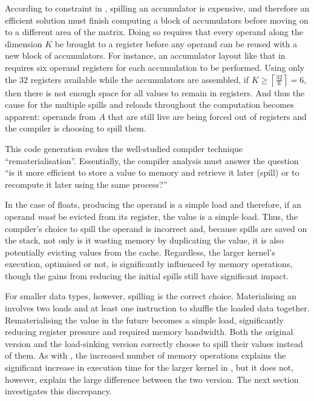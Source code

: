 \documentclass[\main/thesis.tex]{subfiles}
\begin{document}
According to constraint  in , spilling an accumulator is expensive, and therefore an efficient solution must finish computing a block of accumulators before moving on to a different area of the matrix.
Doing so requires that every operand along the dimension $K$ be brought to a register before any operand can be reused with a new block of accumulators.
For instance, an accumulator layout like that in  requires six operand registers for each accumulation to be performed.
Using only the 32 registers available while the accumulators are assembled, if $K \geq \left\lceil \frac{32}{6} \right\rceil = 6$, then there is not enough space for all values to remain in registers.
And thus the cause for the multiple spills and reloads throughout the computation becomes apparent: operands from $A$ that are still \gls{live} are being forced out of registers and the compiler is choosing to spill them.\footnotemark
{}

This code generation evokes the well-studied compiler technique ``\gls{rematerialisation}''.
Essentially, the compiler analysis must answer the question ``is it more efficient to store a value to memory and retrieve it later (\gls{spill}) or to recompute it later using the same process?''

In the case of floats, producing the operand is a simple load and therefore, if an operand \emph{must} be evicted from its register,  the value is a simple load.
Thus, the compiler's choice to spill the operand is incorrect and, because spills are saved on the stack, not only is it wasting memory by duplicating the value, it is also potentially evicting values from the cache.
Regardless, the larger kernel's execution, optimised or not, is significantly influenced by memory operations, though the gains from reducing the initial spills still have significant impact.

For smaller data types, however, spilling is the correct choice.
Materialising an  involves two loads and at least one instruction to shuffle the loaded data together.
Rematerialising the value in the future becomes a simple load, significantly reducing register pressure and required memory bandwidth.
Both the original version and the load-sinking version correctly choose to spill their values instead of  them.
As with , the increased number of memory operations explains the significant increase in execution time for the larger  kernel in , but it does not, however, explain the large difference between the two version.
The next section investigates this discrepancy.
\end{document}
